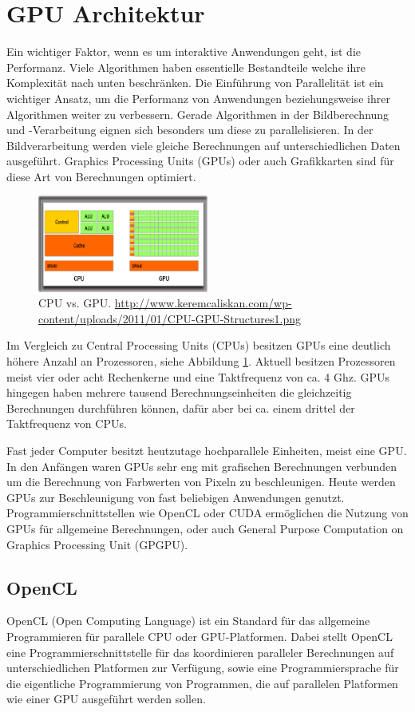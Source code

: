 \section{GPU Architektur}\label{sec::gpuarc}
Ein wichtiger Faktor, wenn es um interaktive Anwendungen geht, ist die Performanz.
Viele Algorithmen haben essentielle Bestandteile welche ihre Komplexität nach unten beschränken.
Die Einführung von Parallelität ist ein wichtiger Ansatz, um die Performanz von Anwendungen beziehungsweise ihrer Algorithmen weiter zu verbessern.
Gerade Algorithmen in der Bildberechnung und -Verarbeitung eignen sich besonders um diese zu parallelisieren.
In der Bildverarbeitung werden viele gleiche Berechnungen auf unterschiedlichen Daten ausgeführt.
Graphics Processing Units (GPUs) oder auch Grafikkarten sind für diese Art von Berechnungen optimiert.
\begin{figure}
	\centering
	\includegraphics[width=0.5\textwidth]{../../Grafiken/CPU-GPU-Structures1.png}
	\caption{CPU vs. GPU. \url{http://www.keremcaliskan.com/wp-content/uploads/2011/01/CPU-GPU-Structures1.png}}
	\label{fig::ga01}
\end{figure}
Im Vergleich zu Central Processing Units (CPUs) besitzen GPUs eine deutlich höhere Anzahl an Prozessoren, siehe Abbildung \ref{fig::ga01}.
Aktuell besitzen Prozessoren meist vier oder acht Rechenkerne und eine Taktfrequenz von ca. 4 Ghz.
GPUs hingegen haben mehrere tausend Berechnungseinheiten die gleichzeitig Berechnungen durchführen können, dafür aber bei ca. einem drittel der Taktfrequenz von CPUs.

Fast jeder Computer besitzt heutzutage hochparallele Einheiten, meist eine GPU.
In den Anfängen waren GPUs sehr eng mit grafischen Berechnungen verbunden um die Berechnung von Farbwerten von Pixeln zu beschleunigen.
Heute werden GPUs zur Beschleunigung von fast beliebigen Anwendungen genutzt.
Programmierschnittstellen wie OpenCL oder CUDA ermöglichen die Nutzung von GPUs für allgemeine Berechnungen, oder auch General Purpose Computation on Graphics Processing Unit (GPGPU).

\subsection*{OpenCL}
OpenCL (Open Computing Language) ist ein Standard für das allgemeine Programmieren für parallele CPU oder GPU-Platformen.
Dabei stellt OpenCL eine Programmierschnittstelle für das koordinieren paralleler Berechnungen auf unterschiedlichen Platformen zur Verfügung, sowie eine Programmiersprache für die eigentliche Programmierung von Programmen, die auf parallelen Platformen wie einer GPU ausgeführt werden sollen.

